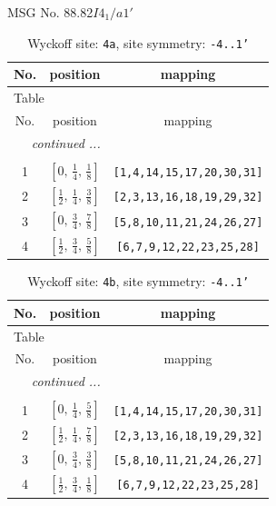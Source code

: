 \documentclass[fleqn,8pt]{jsarticle}
\begin{document}
\setcounter{MaxMatrixCols}{32}

\renewcommand{\tablename}{Table~}
\renewcommand{\figurename}{Figure~}
\begin{center}
\LARGE
MSG No. 88.82\quad$I4_{1}/a1'$
\end{center}
\renewcommand{\arraystretch}{1.2}
\begin{longtable}{ccc}
\caption{Wyckoff site: {\tt 4a}, site symmetry: {\tt -4..1'}}
 \\
 \hline \hline
No. & position & mapping \\ \hline \endfirsthead

\multicolumn{2}{l}{\tablename\ \thetable{}} \\
 \hline \hline
No. & position & mapping \\ \hline \endhead

 \hline \hline
\multicolumn{2}{r}{\footnotesize\it continued ...} \\ \endfoot

 \hline \hline
\multicolumn{2}{r}{} \\ \endlastfoot

1 & $\left[ 0,\, \frac{1}{4},\, \frac{1}{8} \right]$ & {\tt [1,4,14,15,17,20,30,31]} \\ \hline
2 & $\left[ \frac{1}{2},\, \frac{1}{4},\, \frac{3}{8} \right]$ & {\tt [2,3,13,16,18,19,29,32]} \\ \hline
3 & $\left[ 0,\, \frac{3}{4},\, \frac{7}{8} \right]$ & {\tt [5,8,10,11,21,24,26,27]} \\ \hline
4 & $\left[ \frac{1}{2},\, \frac{3}{4},\, \frac{5}{8} \right]$ & {\tt [6,7,9,12,22,23,25,28]} \\
\end{longtable}
\renewcommand{\arraystretch}{1.2}
\begin{longtable}{ccc}
\caption{Wyckoff site: {\tt 4b}, site symmetry: {\tt -4..1'}}
 \\
 \hline \hline
No. & position & mapping \\ \hline \endfirsthead

\multicolumn{2}{l}{\tablename\ \thetable{}} \\
 \hline \hline
No. & position & mapping \\ \hline \endhead

 \hline \hline
\multicolumn{2}{r}{\footnotesize\it continued ...} \\ \endfoot

 \hline \hline
\multicolumn{2}{r}{} \\ \endlastfoot

1 & $\left[ 0,\, \frac{1}{4},\, \frac{5}{8} \right]$ & {\tt [1,4,14,15,17,20,30,31]} \\ \hline
2 & $\left[ \frac{1}{2},\, \frac{1}{4},\, \frac{7}{8} \right]$ & {\tt [2,3,13,16,18,19,29,32]} \\ \hline
3 & $\left[ 0,\, \frac{3}{4},\, \frac{3}{8} \right]$ & {\tt [5,8,10,11,21,24,26,27]} \\ \hline
4 & $\left[ \frac{1}{2},\, \frac{3}{4},\, \frac{1}{8} \right]$ & {\tt [6,7,9,12,22,23,25,28]} \\
\end{longtable}
\end{document}
